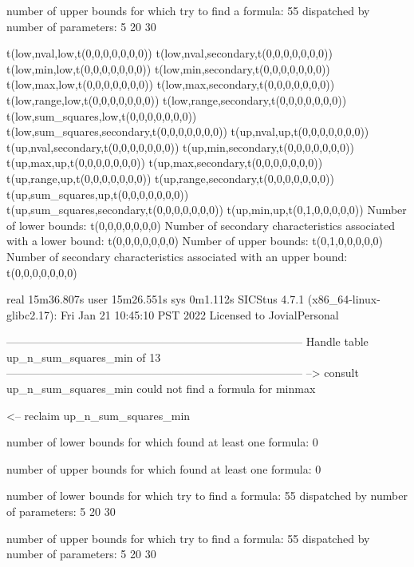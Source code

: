 number of upper bounds for which try to find a formula: 55
dispatched by number of parameters: 5  20  30

t(low,nval,low,t(0,0,0,0,0,0,0))
t(low,nval,secondary,t(0,0,0,0,0,0,0))
t(low,min,low,t(0,0,0,0,0,0,0))
t(low,min,secondary,t(0,0,0,0,0,0,0))
t(low,max,low,t(0,0,0,0,0,0,0))
t(low,max,secondary,t(0,0,0,0,0,0,0))
t(low,range,low,t(0,0,0,0,0,0,0))
t(low,range,secondary,t(0,0,0,0,0,0,0))
t(low,sum_squares,low,t(0,0,0,0,0,0,0))
t(low,sum_squares,secondary,t(0,0,0,0,0,0,0))
t(up,nval,up,t(0,0,0,0,0,0,0))
t(up,nval,secondary,t(0,0,0,0,0,0,0))
t(up,min,secondary,t(0,0,0,0,0,0,0))
t(up,max,up,t(0,0,0,0,0,0,0))
t(up,max,secondary,t(0,0,0,0,0,0,0))
t(up,range,up,t(0,0,0,0,0,0,0))
t(up,range,secondary,t(0,0,0,0,0,0,0))
t(up,sum_squares,up,t(0,0,0,0,0,0,0))
t(up,sum_squares,secondary,t(0,0,0,0,0,0,0))
t(up,min,up,t(0,1,0,0,0,0,0))
Number of lower bounds:                                             t(0,0,0,0,0,0,0)
Number of secondary characteristics associated with a lower bound:  t(0,0,0,0,0,0,0)
Number of upper bounds:                                             t(0,1,0,0,0,0,0)
Number of secondary characteristics associated with an upper bound: t(0,0,0,0,0,0,0)

real	15m36.807s
user	15m26.551s
sys	0m1.112s
SICStus 4.7.1 (x86_64-linux-glibc2.17): Fri Jan 21 10:45:10 PST 2022
Licensed to JovialPersonal


--------------------------------------------------------------------------------
Handle table up_n_sum_squares_min of 13
--------------------------------------------------------------------------------
--> consult up_n_sum_squares_min
could not find a formula for minmax

<-- reclaim up_n_sum_squares_min

number of lower bounds for which found at least one formula: 0

number of upper bounds for which found at least one formula: 0

number of lower bounds for which try to find a formula: 55
dispatched by number of parameters: 5  20  30

number of upper bounds for which try to find a formula: 55
dispatched by number of parameters: 5  20  30

